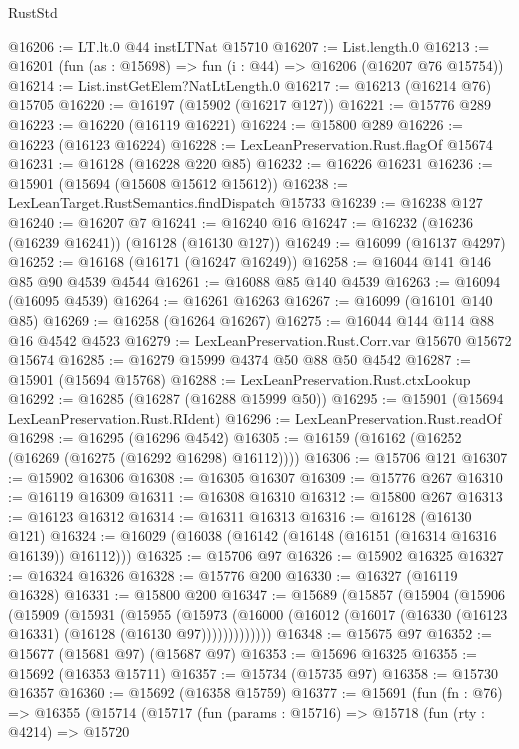 \begin{lexlean}{RustStd}
\begin{coremodule}
@16206 := LT.lt.{0} @44 instLTNat @15710
@16207 := List.length.{0}
@16213 := @16201 (fun (as : @15698) => fun (i : @44) => @16206 (@16207 @76 @15754))
@16214 := List.instGetElem?NatLtLength.{0}
@16217 := @16213 (@16214 @76) @15705
@16220 := @16197 (@15902 (@16217 @127))
@16221 := @15776 @289
@16223 := @16220 (@16119 @16221)
@16224 := @15800 @289
@16226 := @16223 (@16123 @16224)
@16228 := LexLeanPreservation.Rust.flagOf @15674
@16231 := @16128 (@16228 @220 @85)
@16232 := @16226 @16231
@16236 := @15901 (@15694 (@15608 @15612 @15612))
@16238 := LexLeanTarget.RustSemantics.findDispatch @15733
@16239 := @16238 @127
@16240 := @16207 @7
@16241 := @16240 @16
@16247 := @16232 (@16236 (@16239 @16241)) (@16128 (@16130 @127))
@16249 := @16099 (@16137 @4297)
@16252 := @16168 (@16171 (@16247 @16249))
@16258 := @16044 @141 @146 @85 @90 @4539 @4544
@16261 := @16088 @85 @140 @4539
@16263 := @16094 (@16095 @4539)
@16264 := @16261 @16263
@16267 := @16099 (@16101 @140 @85)
@16269 := @16258 (@16264 @16267)
@16275 := @16044 @144 @114 @88 @16 @4542 @4523
@16279 := LexLeanPreservation.Rust.Corr.var @15670 @15672 @15674
@16285 := @16279 @15999 @4374 @50 @88 @50 @4542
@16287 := @15901 (@15694 @15768)
@16288 := LexLeanPreservation.Rust.ctxLookup
@16292 := @16285 (@16287 (@16288 @15999 @50))
@16295 := @15901 (@15694 LexLeanPreservation.Rust.RIdent)
@16296 := LexLeanPreservation.Rust.readOf
@16298 := @16295 (@16296 @4542)
@16305 := @16159 (@16162 (@16252 (@16269 (@16275 (@16292 @16298) @16112))))
@16306 := @15706 @121
@16307 := @15902 @16306
@16308 := @16305 @16307
@16309 := @15776 @267
@16310 := @16119 @16309
@16311 := @16308 @16310
@16312 := @15800 @267
@16313 := @16123 @16312
@16314 := @16311 @16313
@16316 := @16128 (@16130 @121)
@16324 := @16029 (@16038 (@16142 (@16148 (@16151 (@16314 @16316 @16139)) @16112)))
@16325 := @15706 @97
@16326 := @15902 @16325
@16327 := @16324 @16326
@16328 := @15776 @200
@16330 := @16327 (@16119 @16328)
@16331 := @15800 @200
@16347 := @15689
    (@15857
      (@15904
        (@15906
          (@15909
            (@15931
              (@15955
                (@15973
                  (@16000 (@16012 (@16017 (@16330 (@16123 @16331) (@16128 (@16130 @97)))))))))))))
@16348 := @15675 @97
@16352 := @15677 (@15681 @97) (@15687 @97)
@16353 := @15696 @16325
@16355 := @15692 (@16353 @15711)
@16357 := @15734 (@15735 @97)
@16358 := @15730 @16357
@16360 := @15692 (@16358 @15759)
@16377 := @15691
    (fun (fn : @76) =>
    @16355
      (@15714
        (@15717
          (fun (params : @15716) =>
          @15718
            (fun (rty : @4214) =>
            @15720

\end{coremodule}
\end{lexlean}
